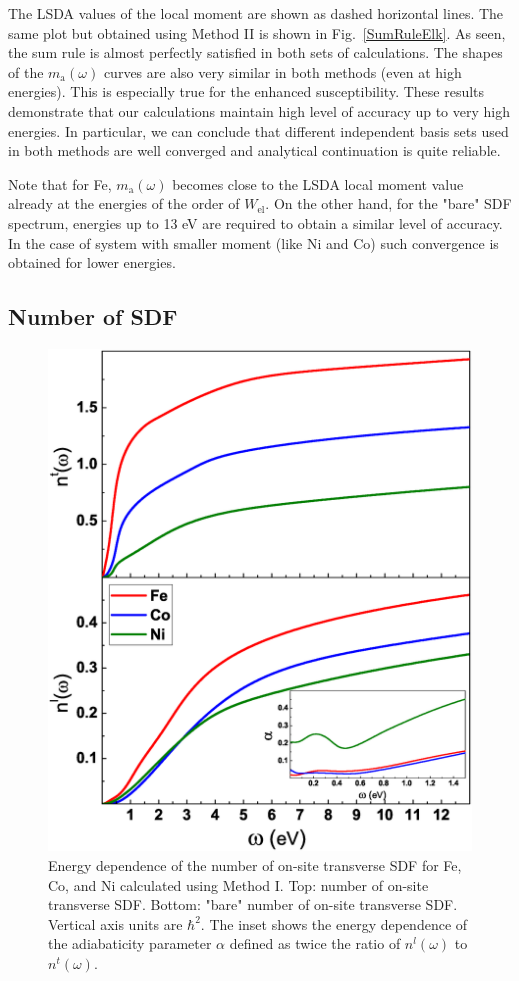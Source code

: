The LSDA values of the local moment are shown as dashed horizontal lines. The same plot but obtained using Method II is shown in Fig.~\ref{SumRuleElk}. As seen, the sum rule is almost perfectly satisfied in both sets of calculations. The shapes of the $m_{\text{a}}(\omega)$ curves are also very similar in both methods (even at high energies). This is especially true for the enhanced susceptibility. These results demonstrate that our calculations maintain high level of accuracy up to very high energies. In particular, we can conclude that different independent basis sets used in both methods are well converged and analytical continuation is quite reliable.
 
Note that for Fe, $m_{\text{a}}(\omega)$ becomes close to the LSDA local moment value already at the energies of the order of $W_{\text{el}}$. On the other hand, for the "bare" SDF spectrum, energies up to 13 eV are required to obtain a similar level of accuracy. In the case of system with smaller moment (like Ni and Co) such convergence is obtained for lower energies.
\FloatBarrier


\subsection{Number of SDF}


\begin{figure}[t!]
\centering
\includegraphics[width=0.55\hsize]{Chapters/TDDFT/figures/Article/nsf.eps}
\caption{Energy dependence of the number of on-site transverse SDF for Fe, Co, and Ni calculated using Method I. Top: number of on-site transverse SDF. Bottom: "bare" number of on-site transverse SDF. Vertical axis units are $\hbar^2$. The inset shows the energy dependence of the adiabaticity parameter $\alpha$ defined as twice the ratio of $n^l(\omega)$ to $n^t(\omega)$.}
\label{nsf}
\end{figure} 

